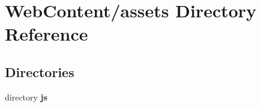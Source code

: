 \section{Web\-Content/assets Directory Reference}
\label{dir_27bf7fa6dd6e2333ba4e2a4136f93433}
\subsection*{Directories}
\begin{DoxyCompactItemize}
\item 
directory {\bf js}
\end{DoxyCompactItemize}
